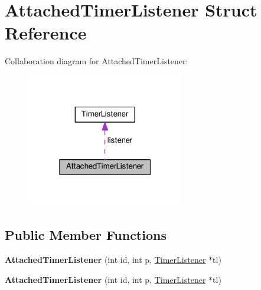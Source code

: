 \hypertarget{struct_attached_timer_listener}{}\section{Attached\+Timer\+Listener Struct Reference}
\label{struct_attached_timer_listener}


Collaboration diagram for Attached\+Timer\+Listener\+:\nopagebreak
\begin{figure}[H]
\begin{center}
\leavevmode
\includegraphics[width=195pt]{struct_attached_timer_listener__coll__graph}
\end{center}
\end{figure}
\subsection*{Public Member Functions}
\begin{DoxyCompactItemize}
\item 
\mbox{\label{struct_attached_timer_listener_a09a67e6d6a36500d3f698f2ba7a20915}} 
{\bfseries Attached\+Timer\+Listener} (int id, int p, \hyperlink{class_timer_listener}{Timer\+Listener} $\ast$tl)
\item 
\mbox{\label{struct_attached_timer_listener_a09a67e6d6a36500d3f698f2ba7a20915}} 
{\bfseries Attached\+Timer\+Listener} (int id, int p, \hyperlink{class_timer_listener}{Timer\+Listener} $\ast$tl)
\end{DoxyCompactItemize}
